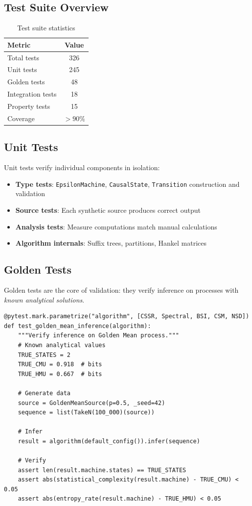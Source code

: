 \documentclass[11pt,a4paper]{report}
\theoremstyle{definition}
\theoremstyle{plain}
\begin{document}
\subsection{Test Suite Overview}

\begin{table}[h]
\centering
\caption{Test suite statistics}
\label{tab:test-stats}
\begin{tabular}{lc}
\toprule
Metric & Value \\
\midrule
Total tests & 326 \\
Unit tests & 245 \\
Golden tests & 48 \\
Integration tests & 18 \\
Property tests & 15 \\
Coverage & $>90\%$ \\
\bottomrule
\end{tabular}
\end{table}

\subsection{Unit Tests}

Unit tests verify individual components in isolation:

\begin{itemize}
    \item \textbf{Type tests}: \texttt{EpsilonMachine}, \texttt{CausalState}, \texttt{Transition} construction and validation
    \item \textbf{Source tests}: Each synthetic source produces correct output
    \item \textbf{Analysis tests}: Measure computations match manual calculations
    \item \textbf{Algorithm internals}: Suffix trees, partitions, Hankel matrices
\end{itemize}

\subsection{Golden Tests}

Golden tests are the core of validation: they verify inference on processes with \emph{known analytical solutions}.

\begin{lstlisting}[caption={Golden test structure}]
@pytest.mark.parametrize("algorithm", [CSSR, Spectral, BSI, CSM, NSD])
def test_golden_mean_inference(algorithm):
    """Verify inference on Golden Mean process."""
    # Known analytical values
    TRUE_STATES = 2
    TRUE_CMU = 0.918  # bits
    TRUE_HMU = 0.667  # bits

    # Generate data
    source = GoldenMeanSource(p=0.5, _seed=42)
    sequence = list(TakeN(100_000)(source))

    # Infer
    result = algorithm(default_config()).infer(sequence)

    # Verify
    assert len(result.machine.states) == TRUE_STATES
    assert abs(statistical_complexity(result.machine) - TRUE_CMU) < 0.05
    assert abs(entropy_rate(result.machine) - TRUE_HMU) < 0.05
\end{lstlisting}
\end{document}
